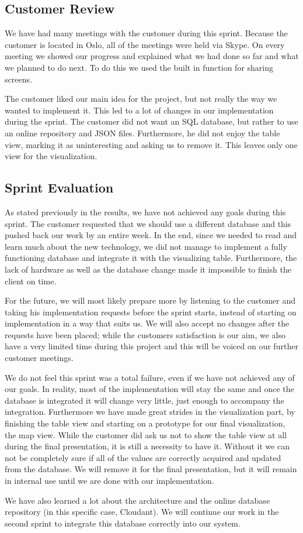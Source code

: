 \documentclass[../document.tex]{subfiles}
\begin{document}
\subsection{Customer Review}
We have had many meetings with the customer during this sprint. Because the customer is located in Oslo, all of the meetings were held via Skype. On every meeting we showed our progress and explained what we had done so far and what we planned to do next. To do this we used the built in function for sharing screens. 

The customer liked our main idea for the project, but not really the way we wanted to implement it. This led to a lot of changes in our implementation during the sprint. The customer did not want an \gls{SQL} database, but rather to use an online repository and \gls{JSON} files. Furthermore, he did not enjoy the table view, marking it as uninteresting and asking us to remove it. This leaves only one view for the visualization. 

\subsection{Sprint Evaluation}
As stated previously in the results, we have not achieved any goals during this sprint. The customer requested that we should use a different database and this pushed back our work by an entire week. In the end, since we needed to read and learn much about the new technology, we did not manage to implement a fully functioning database and integrate it with the visualizing table. Furthermore, the lack of hardware as well as the database change made it impossible to finish the client on time.

For the future, we will most likely prepare more by listening to the customer and taking his implementation requests before the sprint starts, instead of starting on implementation in a way that suits us. We will also accept no changes after the requests have been placed; while the customers satisfaction is our aim, we also have a very limited time during this project and this will be voiced on our further customer meetings.

We do not feel this sprint was a total failure, even if we have not achieved any of our goals. In reality, most of the implementation will stay the same and once the database is integrated it will change very little, just enough to accompany the integration. Furthermore we have made great strides in the visualization part, by finishing the table view and starting on a prototype for our final visualization, the map view. While the customer did ask us not to show the table view at all during the final presentation, it is still a necessity to have it. Without it we can not be completely sure if all of the values are correctly acquired and updated from the database. We will remove it for the final presentation, but it will remain in internal use until we are done with our implementation.

We have also learned a lot about the architecture and the online database repository (in this specific case, \gls{Cloudant}). We will continue our work in the second sprint to integrate this database correctly into our system.
\end{document}
